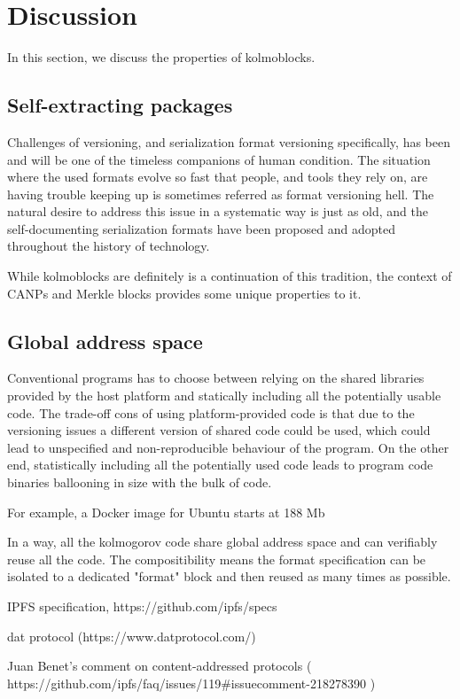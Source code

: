 \documentclass[twocolumn,aps,pra,floatfix]{revtex4-1}
\begin{document}
\section{Discussion}
In this section, we discuss the properties of kolmoblocks. 
\subsection{Self-extracting packages}
Challenges of versioning, and serialization format versioning specifically, has been and will be one of the timeless companions of human condition. The situation where the used formats evolve so fast that people, and tools they rely on, are having trouble keeping up is sometimes referred as format versioning hell.
The natural desire to address this issue in a systematic way is just as old, and the self-documenting serialization formats have been proposed and adopted throughout the history of technology. 

While kolmoblocks are definitely is a continuation of this tradition, the context of CANPs and Merkle blocks provides some unique properties to it.

\subsection{Global address space}
Conventional programs has to choose between relying on the shared libraries provided by the host platform and statically including all the potentially usable code. The trade-off cons of using platform-provided code is that due to the versioning issues a different version of shared code could be used, which could lead to unspecified and non-reproducible behaviour of the program. On the other end, statistically including all the potentially used code leads to program code binaries ballooning in size with the bulk of code. 

For example, a Docker image for Ubuntu starts at 188 Mb      


In a way, all the kolmogorov code share global address space and can verifiably reuse all the code. 
The compositibility means the format specification can be isolated to a dedicated "format" block and then reused as many times as possible.


\begin{thebibliography}{10}
  IPFS specification, https://github.com/ipfs/specs

dat protocol (https://www.datprotocol.com/)

 Juan Benet's comment on content-addressed protocols ( https://github.com/ipfs/faq/issues/119\#issuecomment-218278390 )

\end{thebibliography}
\end{document}
